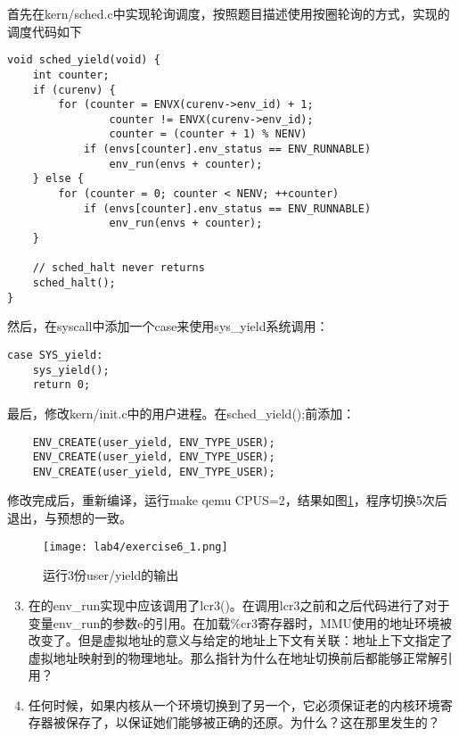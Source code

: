 \begin{exerciseSolution}{6}
    \par 首先在kern/sched.c中实现轮询调度，按照题目描述使用按圈轮询的方式，实现的调度代码如下
    \begin{lstlisting}
void sched_yield(void) {
    int counter;
    if (curenv) {
        for (counter = ENVX(curenv->env_id) + 1;
                counter != ENVX(curenv->env_id);
                counter = (counter + 1) % NENV)
            if (envs[counter].env_status == ENV_RUNNABLE)
                env_run(envs + counter);
    } else {
        for (counter = 0; counter < NENV; ++counter)
            if (envs[counter].env_status == ENV_RUNNABLE)
                env_run(envs + counter);
    }

    // sched_halt never returns
    sched_halt();
}
    \end{lstlisting}

    \par 然后，在syscall中添加一个case来使用sys\_yield系统调用：
    \begin{lstlisting}
case SYS_yield:
    sys_yield();
    return 0;
    \end{lstlisting}

    \par 最后，修改kern/init.c中的用户进程。在sched\_yield();前添加：
    \begin{lstlisting}
    ENV_CREATE(user_yield, ENV_TYPE_USER);
    ENV_CREATE(user_yield, ENV_TYPE_USER);
    ENV_CREATE(user_yield, ENV_TYPE_USER);
    \end{lstlisting}

    \par 修改完成后，重新编译，运行make qemu CPUS=2，结果如图\ref{fig:lab4/exercise6_1}，程序切换5次后退出，与预想的一致。
    \begin{figure}[htb]
        \centering
        \texttt{[image: lab4/exercise6\_1.png]}
        \caption{运行3份user/yield的输出}
        \label{fig:lab4/exercise6_1}
    \end{figure}
\end{exerciseSolution}

\begin{questionEnv}
    \begin{enumerate}
        \setcounter{enumi}{2}
        \item 在的env\_run实现中应该调用了lcr3()。在调用lcr3之前和之后代码进行了对于变量env\_run的参数e的引用。在加载\%cr3寄存器时，MMU使用的地址环境被改变了。但是虚拟地址的意义与给定的地址上下文有关联：地址上下文指定了虚拟地址映射到的物理地址。那么指针为什么在地址切换前后都能够正常解引用？
        \item 任何时候，如果内核从一个环境切换到了另一个，它必须保证老的内核环境寄存器被保存了，以保证她们能够被正确的还原。为什么？这在那里发生的？
    \end{enumerate}
\end{questionEnv}

